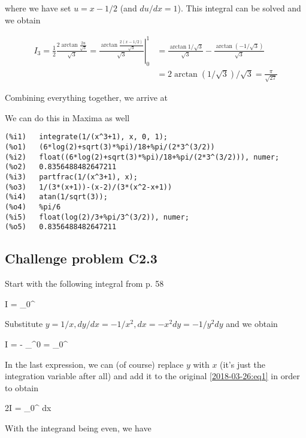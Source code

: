 where we have set $u=x-1/2$ (and $du/dx=1$). This integral can be solved and we obtain

\begin{align*}
I_3 = \frac{1}{2} \frac{2 \arctan \frac{2u}{\sqrt{3}}}{\sqrt{3}} = \left. \frac{ \arctan \frac{2(x-1/2)}{\sqrt{3}}}{\sqrt{3}} \right|_0^1 & = \frac{\arctan 1/\sqrt{3}}{\sqrt{3}} - \frac{\arctan \left(-1/\sqrt{3}\right) }{\sqrt{3}} \\ & = 2 \arctan \left(1/\sqrt{3}\right)/\sqrt{3} = \frac{\pi}{\sqrt{27}}
\end{align*}

Combining everything together, we arrive at

\bee
{}
\eee

We can do this in Maxima as well

\begin{verbatim}
(%i1)	integrate(1/(x^3+1), x, 0, 1);
(%o1)	(6*log(2)+sqrt(3)*%pi)/18+%pi/(2*3^(3/2))
(%i2)	float((6*log(2)+sqrt(3)*%pi)/18+%pi/(2*3^(3/2))), numer;
(%o2)	0.8356488482647211
(%i3)	partfrac(1/(x^3+1), x);
(%o3)	1/(3*(x+1))-(x-2)/(3*(x^2-x+1))
(%i4)	atan(1/sqrt(3));
(%o4)	%pi/6
(%i5)	float(log(2)/3+%pi/3^(3/2)), numer;
(%o5)	0.8356488482647211
\end{verbatim}


\subsection{Challenge problem  C2.3}

Start with the following integral from p. 58 

\be\label{2018-03-26:eq1}
I = \int_0^\infty {}
\ee

Substitute $y=1/x, dy/dx = -1/x^2, dx = -x^2 dy = -1/y^2 dy$ and we obtain

\bee
I = - \int_\infty^0  = \int_0^\infty {}
\eee

In the last expression, we can (of course) replace $y$ with $x$ (it's just the integration variable after all) and add it to the original \eqref{2018-03-26:eq1} in order to obtain

\bee
2I = \int_0^\infty {} dx
\eee

With the integrand being even, we have

